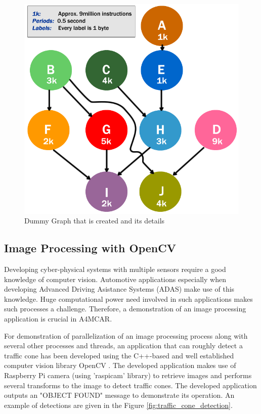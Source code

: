 \begin{figure}[!ht]
	\centering
	\captionsetup{justification=centering}
	\includegraphics[scale=0.4]{content/images/dummygraph.png}
	\caption{Dummy Graph that is created and its details}
	\label{fig:dummygraph}
\end{figure}


\subsection{Image Processing with OpenCV}
Developing cyber-physical systems with multiple sensors require a good knowledge of computer vision. Automotive applications especially when developing Advanced Driving Asistance Systems (ADAS) make use of this knowledge. Huge computational power need involved in such applications makes such processes a challenge. Therefore, a demonstration of an image processing application is crucial in A4MCAR.

For demonstration of parallelization of an image processing process along with several other processes and threads, an application that can roughly detect a traffic cone has been developed using the C++-based and well established computer vision library OpenCV \cite{opencv}. The developed application makes use of Raspberry Pi camera (using 'raspicam' library) to retrieve images and performs several transforms to the image to detect traffic cones. The developed application outputs an "OBJECT FOUND" message to demonstrate its operation. An example of detections are given in the Figure \ref{fig:traffic_cone_detection}.

